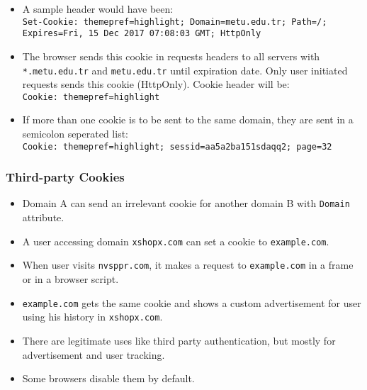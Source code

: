\documentclass[trans,compress,xcolor=table]{beamer}
\begin{document}
\begin{frame}
\begin{itemize}
\item A sample header would have been:\\
 \texttt{\scriptsize Set-Cookie: themepref=highlight; Domain=metu.edu.tr; Path=/; Expires=Fri, 15 Dec 2017 07:08:03 GMT; HttpOnly}
\item The browser sends this cookie in requests headers to all servers with \texttt{*.metu.edu.tr}  and \texttt{metu.edu.tr} until expiration date. Only user initiated requests sends this cookie (HttpOnly). Cookie header will be:\\
\texttt{\scriptsize Cookie: themepref=highlight}
\item If more than one cookie is to be sent to the same domain, they are sent in a semicolon seperated list:\\
\texttt{\scriptsize Cookie: themepref=highlight; sessid=aa5a2ba151sdaqq2; page=32}
\end{itemize}
\end{frame}

\begin{frame}
\frametitle{Third-party Cookies}
\begin{itemize}
\item  Domain A can send an irrelevant cookie for another domain B with \lstinline!Domain! attribute.
\item A user accessing domain \lstinline!xshopx.com! can set a cookie to \lstinline!example.com!.
\item When user visits \lstinline!nvsppr.com!, it makes a request to \lstinline!example.com! in a frame or in a
	browser script.
\item \lstinline!example.com! gets the same cookie and shows a custom advertisement for user using
his history in \lstinline!xshopx.com!.
\item There are legitimate uses like third party authentication, but mostly for advertisement and user tracking.
\item Some browsers disable them by default.
\end{itemize}
\end{frame}
\end{document}
